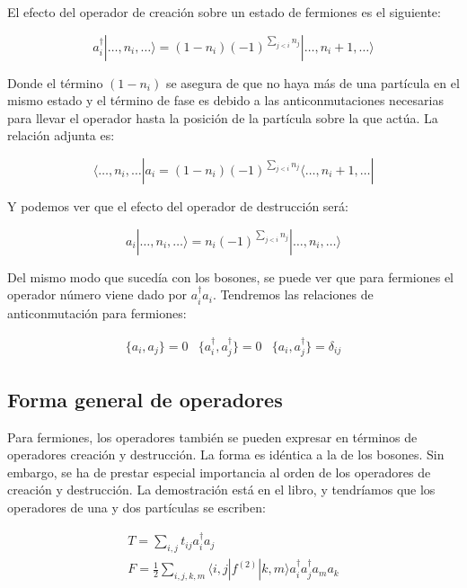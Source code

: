 \documentclass{article} %
\begin{document}
El efecto del operador de creación sobre un estado de fermiones es el siguiente:

\begin{equation}
a_i^{\dagger} |\ldots, n_i, \ldots\rangle = (1 - n_i) (-1)^{\sum_{j<i} n_j} | \ldots, n_i + 1, \ldots\rangle
\end{equation}

Donde el término $(1 - n_i)$ se asegura de que no haya más de una partícula en el mismo estado y el término de fase es debido a las anticonmutaciones necesarias para llevar el operador hasta la posición de la partícula sobre la que actúa. La relación adjunta es:

$$
\langle\ldots, n_i, \ldots | a_i = (1 - n_i) (-1)^{\sum_{j<i} n_j} \langle\ldots, n_i + 1, \ldots |
$$

Y podemos ver que el efecto del operador de destrucción será:

\begin{equation}
a_i | \ldots, n_i, \ldots\rangle = n_i (-1)^{\sum_{j<i} n_j} | \ldots, n_i, \ldots\rangle
\end{equation}

Del mismo modo que sucedía con los bosones, se puede ver que para fermiones el operador número viene dado por $a_i^{\dagger} a_i$. Tendremos las relaciones de anticonmutación para fermiones:

\begin{equation}
\begin{array}{ccc}
\{ a_i, a_j \} = 0 & \{ a_i^{\dagger}, a_j^{\dagger} \} = 0 & \{ a_i, a_j^{\dagger} \} = \delta_{ij}
\end{array}
\end{equation}

\subsection{Forma general de operadores}

Para fermiones, los operadores también se pueden expresar en términos de operadores creación y destrucción. La forma es idéntica a la de los bosones. Sin embargo, se ha de prestar especial importancia al orden de los operadores de creación y destrucción. La demostración está en el libro, y tendríamos que los operadores de una y dos partículas se escriben:

\begin{align}
T = \sum_{i, j} t_{ij} a_i^{\dagger} a_j \\
F = \frac{1}{2} \sum_{i, j, k, m} \langle i, j | f^{(2)} |k, m \rangle a_i^{\dagger} a_j^{\dagger} a_m a_k
\end{align}
\end{document}
